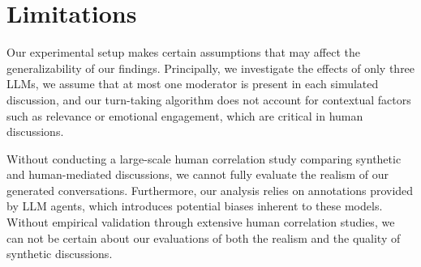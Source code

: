 %
\section{Limitations} 

Our experimental setup makes certain assumptions that may affect the generalizability of our findings. Principally, we investigate the effects of only three \acp{LLM}, we assume that at most one moderator is present in each simulated discussion, and our turn-taking algorithm does not account for contextual factors such as relevance or emotional engagement, which are critical in human discussions. 

Without conducting a large-scale human correlation study comparing synthetic and human-mediated discussions, we cannot fully evaluate the realism of our generated conversations. Furthermore, our analysis relies on annotations provided by \ac{LLM} agents, which introduces potential biases inherent to these models. Without empirical validation through extensive human correlation studies, we can not be certain about our evaluations of both the realism and the quality of synthetic discussions.